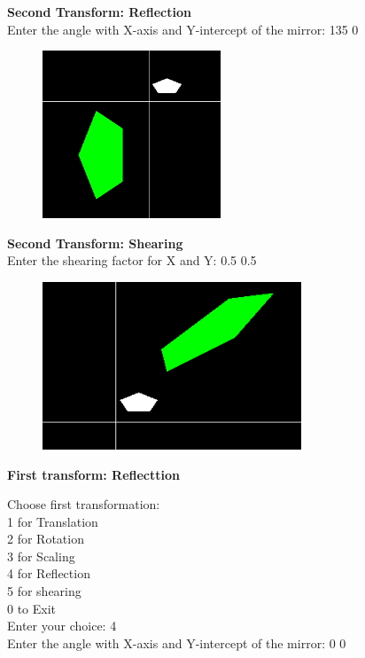 \documentclass[9pt,letterpaper]{article}
\begin{document}
\textbf{\large{Second Transform: Reflection}}\\
Enter the angle with X-axis and Y-intercept of the mirror: 135 0\\

\begin{figure}[h]
    \centering
    \includegraphics[height=5cm]{CompositeTransformations/Outputs/ScaleReflect.png}
\end{figure}

\newpage

\textbf{\large{Second Transform: Shearing}}\\
Enter the shearing factor for X and Y: 0.5 0.5 \\

\begin{figure}[h]
    \centering
    \includegraphics[height=5cm]{CompositeTransformations/Outputs/ScaleShear.png}
\end{figure}

\newpage

\textbf{\Large{First transform: Reflecttion}}

Choose first transformation: \\
1 for Translation\\
2 for Rotation\\
3 for Scaling\\
4 for Reflection\\
5 for shearing\\
0 to Exit\\
Enter your choice: 4\\
Enter the angle with X-axis and Y-intercept of the mirror: 0 0\\
\end{document}
